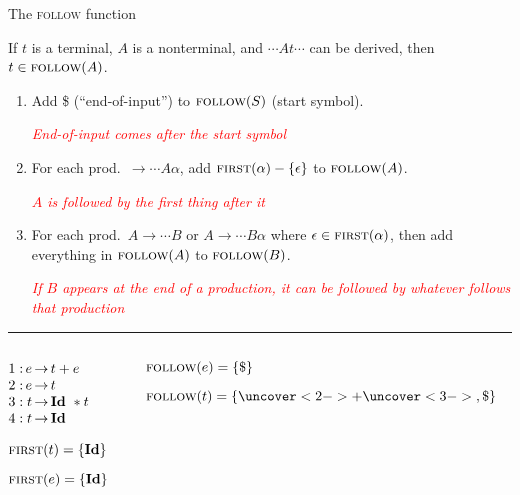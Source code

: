 \documentclass{plt}
\makeatletter
\newcommand{\id}{\textbf{Id}}
\newcommand{\grammarone}{
\renewcommand{\arraystretch}{1}
$\begin{array}[t]{@{}l@{\,}r@{\,}c@{\,}l@{}}
1: & e & \rightarrow & t + e \\
2: & e & \rightarrow & t \\
3: & t & \rightarrow & \id\ * t \\
4: & t & \rightarrow & \id
\end{array}$
}
\makeatother
\begin{document}
\begin{frame}{The \textsc{follow} function}

\footnotesize

If $t$ is a terminal, $A$ is a nonterminal, and $\cdots A t \cdots$
can be derived, then $t \in \textsc{follow}(A)$.

\begin{enumerate}
\item Add \$ (``end-of-input'') to $\textsc{follow}(S)$ (start symbol).

  \textcolor{red}{\emph{End-of-input comes after the start symbol}}

\item For each prod.\ $\rightarrow \cdots A \alpha$, add
  $\textsc{first}(\alpha) - \{ \epsilon \}$ to $\textsc{follow}(A)$.

  \textcolor{red}{\emph{$A$ is followed by the first thing after it}}

\item For each prod.\ $A \rightarrow \cdots B$ or $A \rightarrow
  \cdots B \alpha$ where $\epsilon \in \textsc{first}(\alpha)$, then add
  everything in $\textsc{follow}(A)$ to $\textsc{follow}(B)$.

  \textcolor{red}{\emph{If $B$ appears at the end of a production, it
      can be followed by whatever follows that production}}

\end{enumerate}

\hrule

\vspace{5pt}

\begin{columns}
\begin{column}[t]{0.3\textwidth}
\grammarone

$\first(t) = \{\id\}$

$\first(e) = \{\id\}$
\end{column}
\begin{column}[t]{0.7\textwidth}
$\textsc{follow}(e) = \{ \$ \}$

$\follow(t) = \{ \uncover<2->{+} \uncover<3->{, \$} \}$

\medskip

%
%
%

\end{column}
\end{columns}

\end{frame}
\end{document}
